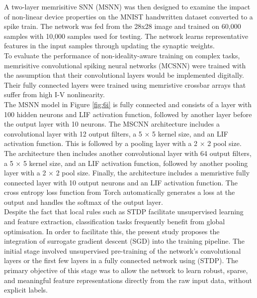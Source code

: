 \noindent A two-layer memrisitive SNN (MSNN) was then designed to examine the impact of non-linear device properties on the MNIST handwritten dataset converted to a spike train.  The network was fed from the 28x28 image and trained on 60,000 samples with 10,000 samples used for testing. The network learns representative features in the input samples through updating the synaptic weights. \\


\noindent To evaluate the performance of non-ideality-aware training on complex tasks, memrisitive convolutional spiking neural networks (MCSNN) were trained with the assumption that their convolutional layers would be implemented digitally. Their fully connected layers were trained using memristive crossbar arrays that suffer from high I-V nonlinearity. \\

\noindent The MSNN model in Figure \ref{fig:6i} is fully connected and consists of a layer with 100 hidden neurons and LIF activation function, followed by another layer before the output layer with 10 neurons. The MSCNN architecture includes a convolutional layer with 12 output filters, a 5 × 5 kernel size, and an LIF activation function. This is followed by a pooling layer with a 2 × 2 pool size. \\

\noindent The architecture then includes another convolutional layer with 64 output filters, a 5 × 5 kernel size, and an LIF activation function, followed by another pooling layer with a 2 × 2 pool size. Finally, the architecture includes a memristive fully connected layer with 10 output neurons and an LIF activation function. The cross entropy loss function from Torch \cite{eshraghian2023training} automatically generates a loss at the output and handles the softmax of the output layer. \\

\noindent Despite the fact that local rules such as STDP facilitate unsupervised learning and feature extraction, classification tasks frequently benefit from global optimisation. In order to facilitate this, the present study proposes the integration of surrogate gradient descent (SGD) into the training pipeline. The initial stage involved unsupervised pre-training of the network's convolutional layers or the first few layers in a fully connected network using (STDP). The primary objective of this stage was to allow the network to learn robust, sparse, and meaningful feature representations directly from the raw input data, without explicit labels.\\

